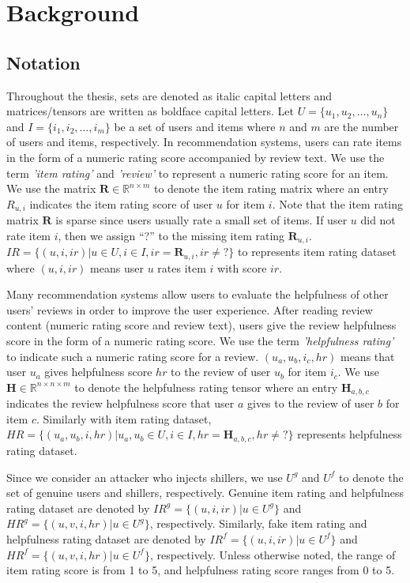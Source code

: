 \documentclass[master,english,final]{kaist-ucs}
\begin{document}
\chapter{Background}
\section{Notation}
Throughout the thesis, sets are denoted as italic capital letters and matrices/tensors are written as boldface capital letters.
Let $U = \{u_1,u_2,…,u_n\}$ and $I = \{i_1,i_2,…,i_m\}$ be a set of users and items where $n$ and $m$ are the number of users and items, respectively.
In recommendation systems, users can rate items in the form of a numeric rating score accompanied by review text.
We use the term \textit{'item rating'} and \textit{'review'} to represent a numeric rating score for an item.
We use the matrix $ \bm{R} \in \mathbb{R}^{n \times m} $ to denote the item rating matrix where an entry $ R_{u,i} $ indicates the item rating score of user $u$ for item $i$.
Note that the item rating matrix $\bm{R}$ is sparse since users usually rate a small set of items.
If user $u$ did not rate item $i$, then we assign “?” to the missing item rating $\bm{R}_{u,i}$.
$IR=\{(u,i,ir)| u \in U,i \in I,ir=\bm{R}_{u,i},ir \neq ? \}$ to represents item rating dataset where $(u,i,ir)$ means user $u$ rates item $i$ with score $ir$.

Many recommendation systems allow users to evaluate the helpfulness of other users’ reviews in order to improve the user experience.
After reading review content (numeric rating score and review text), users give the review helpfulness score in the form of a numeric rating score.
We use the term \textit{'helpfulness rating'} to indicate such a numeric rating score for a review.
$(u_a,u_b,i_c,hr)$ means that user $u_a$ gives helpfulness score $hr$ to the review of user $u_b$ for item $i_c$.
We use $\bm{H} \in \mathbb{R}^{n \times n \times m}$ to denote the helpfulness rating tensor where an entry $\bm{H}_{a,b,c}$ indicates the review helpfulness score that user $a$ gives to the review of user $b$ for item $c$.
Similarly with item rating dataset, $HR=\{(u_a,u_b,i,hr)| u_a,u_b \in U,i \in I,hr=\bm{H}_{a,b,c},hr \neq ?\}$ represents helpfulness rating dataset.

Since we consider an attacker who injects shillers, we use $U^g$ and $U^f$ to denote the set of genuine users and shillers, respectively.
Genuine item rating and helpfulness rating dataset are denoted by $IR^g=\{(u,i,ir)|u \in U^g\}$ and $HR^g=\{(u,v,i,hr)|u \in U^g\}$, respectively.
Similarly, fake item rating and helpfulness rating dataset are denoted by $IR^f=\{(u,i,ir)|u \in U^f\}$ and $HR^f=\{(u,v,i,hr)|u \in U^f\}$, respectively.
Unless otherwise noted, the range of item rating score is from 1 to 5, and helpfulness rating score ranges from 0 to 5.
\end{document}
